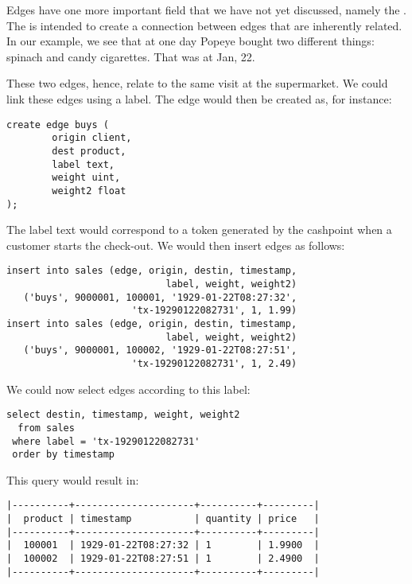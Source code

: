 
Edges have one more important field that we have not yet discussed,
namely the . The  is intended to create a connection
between edges that are inherently related. In our example, we see
that at one day Popeye bought two different things:
spinach and candy cigarettes.
That was at Jan, 22.

These two edges, hence, relate to the same visit at the supermarket.
We could link these edges using a label. The edge would then be created
as, for instance:

\begin{sqlcode}
\begin{lstlisting}
create edge buys (
        origin client,
        dest product,
        label text,
        weight uint,
        weight2 float
);
\end{lstlisting}
\end{sqlcode}

The label text would correspond to a token generated by
the cashpoint when a customer starts the check-out.
We would then insert edges as follows:

\begin{sqlcode}
\begin{lstlisting}
insert into sales (edge, origin, destin, timestamp,
                            label, weight, weight2)
   ('buys', 9000001, 100001, '1929-01-22T08:27:32',
                      'tx-19290122082731', 1, 1.99)
insert into sales (edge, origin, destin, timestamp,
                            label, weight, weight2)
   ('buys', 9000001, 100002, '1929-01-22T08:27:51', 
                      'tx-19290122082731', 1, 2.49)
\end{lstlisting}
\end{sqlcode}

We could now select edges according to this label:

\begin{sqlcode}
\begin{lstlisting}
select destin, timestamp, weight, weight2
  from sales 
 where label = 'tx-19290122082731'
 order by timestamp
\end{lstlisting}
\end{sqlcode}

This query would result in:

\begin{verbatim}
|----------+---------------------+----------+---------|
|  product | timestamp           | quantity | price   |
|----------+---------------------+----------+---------|
|  100001  | 1929-01-22T08:27:32 | 1        | 1.9900  |
|  100002  | 1929-01-22T08:27:51 | 1        | 2.4900  |
|----------+---------------------+----------+---------|
\end{verbatim}

